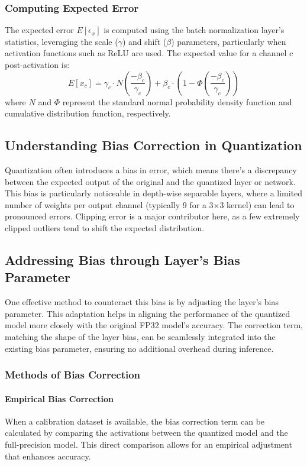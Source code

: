 \documentclass[10pt]{article}
\begin{document}
\subsubsection{Computing Expected Error}
The expected error \( E[\epsilon_x] \) is computed using the batch normalization layer's statistics, leveraging the scale (\( \gamma \)) and shift (\( \beta \)) parameters, particularly when activation functions such as ReLU are used. The expected value for a channel \( c \) post-activation is:
\begin{equation}
    E[x_c] = \gamma_c \cdot N\left(\frac{-\beta_c}{\gamma_c}\right) + \beta_c \cdot \left(1 - \Phi\left(\frac{-\beta_c}{\gamma_c}\right)\right)
\end{equation}
where \( N \) and \( \Phi \) represent the standard normal probability density function and cumulative distribution function, respectively.

\subsection{Understanding Bias Correction in Quantization}
Quantization often introduces a bias in error, which means there's a discrepancy between the expected output of the original and the quantized layer or network. This bias is particularly noticeable in depth-wise separable layers, where a limited number of weights per output channel (typically 9 for a 3×3 kernel) can lead to pronounced errors. Clipping error is a major contributor here, as a few extremely clipped outliers tend to shift the expected distribution.
\subsection{Addressing Bias through Layer’s Bias Parameter}
One effective method to counteract this bias is by adjusting the layer’s bias parameter. This adaptation helps in aligning the performance of the quantized model more closely with the original FP32 model's accuracy. The correction term, matching the shape of the layer bias, can be seamlessly integrated into the existing bias parameter, ensuring no additional overhead during inference.

\subsubsection{Methods of Bias Correction}

\paragraph{Empirical Bias Correction}
When a calibration dataset is available, the bias correction term can be calculated by comparing the activations between the quantized model and the full-precision model. This direct comparison allows for an empirical adjustment that enhances accuracy.
\end{document}
